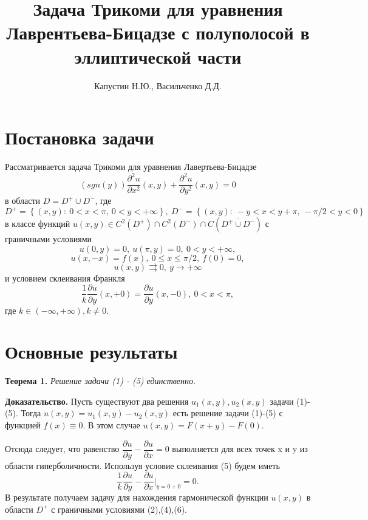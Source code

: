 \documentclass[9pt]{article}
\title{Задача Трикоми для уравнения Лаврентьева-Бицадзе с полуполосой в эллиптической части}
\author{Капустин Н.Ю., Васильченко Д.Д.}
\date{}
\begin{document}
	\maketitle
	\section{Постановка задачи}
	
	Рассматривается задача Трикоми для уравнения Лавертьева-Бицадзе
	\begin{equation}
		\left(sgn (y)\right) \dfrac{\partial^2 u}{\partial x^2}(x,y) + \dfrac{\partial^2 u}{\partial y^2}(x,y) = 0
	\end{equation}
	в области $D = D^{+} \cup D^{-}$, где $D^{+} = \left\{(x,y): \ 0 < x < \pi, \ 0 < y < + \infty \right\}, \ D^{-} = \left\{(x,y): \ -y < x < y + \pi, \ -\pi/2 < y < 0\right\}$ в классе функций $u(x,y) \in C^2(D^{+}) \cap C^2(D^{-}) \cap C(\overline{D^{+} \cup D^{-}})$ с граничными условиями
	\begin{equation}
		u(0,y) = 0, \ u(\pi, y) = 0, \ 0 < y < + \infty,
	\end{equation}
	\begin{equation}
		u(x,-x) = f(x) , \ 0 \leq x \leq \pi/2, \ f(0) = 0, 
	\end{equation}
	\begin{equation}
		u(x,y) \rightrightarrows 0, \ y \to +\infty
	\end{equation}
	и условием склеивания Франкля 
	\begin{equation}
		\dfrac1{k} \dfrac{\partial u}{\partial y}(x, +0) = \dfrac{\partial u}{\partial y} (x, -0), \ 0 < x < \pi, 
	\end{equation}
	где $k \in (-\infty, +\infty), k \neq 0$.
	\section{Основные результаты}
		\textbf{Теорема 1.} \textit{Решение задачи (1) - (5) единственно.}
		
	\textbf{Доказательство.} 
	Пусть существуют два решения $u_1(x,y), u_2(x,y)$ задачи (1)-(5). Тогда $u(x,y) = u_1(x,y) - u_2(x,y)$ есть решение задачи (1)-(5) с функцией $f(x) \equiv 0$. В этом случае $u(x,y) = F(x+y) - F(0)$.
	
	Отсюда следует, что равенство $\dfrac{\partial u}{\partial y} - \dfrac{\partial u}{\partial x} = 0$ выполняется для всех точек x и y из области гиперболичности. Используя условие склеивания  (5) будем иметь
	\begin{equation}
		\dfrac1{k} \dfrac{\partial u}{\partial y} - \dfrac{\partial u}{\partial x}\vert_{y=0+0} = 0.
	\end{equation}
	В результате получаем задачу для нахождения гармонической функции $u(x,y)$ в области $D^{+}$ с граничными условиями (2),(4),(6).
	
\end{document}
